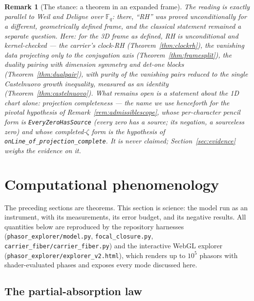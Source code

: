 \documentclass[11pt]{article}
\newtheorem{remark}[definition]{Remark}
\newcommand{\code}[1]{\texttt{#1}}
\begin{document}
\begin{remark}[The stance: a theorem in an expanded frame]\label{rem:framesplit}
The reading is exactly parallel to Weil and Deligne over $\mathbb{F}_q$: there, ``RH'' was proved
unconditionally for a different, geometrically defined frame, and the classical statement remained
a separate question.  Here: for the 3D frame \emph{as defined}, RH is unconditional and
kernel-checked --- the carrier's clock-RH (Theorem~\ref{thm:clockrh}), the vanishing data
projecting only to the conjugation axis (Theorem~\ref{thm:framesplit}), the duality pairing with dimension
symmetry and det-one blocks (Theorem~\ref{thm:dualpair}), with purity of the vanishing pairs
reduced to the single Castelnuovo growth inequality, measured as an identity
(Theorem~\ref{thm:castelnuovo}).  What remains open is a statement about the 1D chart alone:
\emph{projection completeness} --- the name we use henceforth for the pivotal hypothesis of
Remark~\ref{rem:admissiblescope}, whose per-character pencil form is \code{EveryZeroHasSource}
(every zero has a source; its negation, a \emph{sourceless} zero) and whose completed-$\zeta$ form
is the hypothesis of \code{onLine\_of\_projection\_complete}.  It is never claimed; Section~\ref{sec:evidence} weighs
the evidence on it.
\end{remark}

\section{Computational phenomenology}\label{sec:phenomenology}

The preceding sections are theorems.  This section is science: the model run as an instrument, with
its measurements, its error budget, and its negative results.  All quantities below are reproduced
by the repository harnesses (\code{phasor\_explorer/model.py}, \code{focal\_closure.py},
\code{carrier\_fiber/carrier\_fiber.py}) and the interactive WebGL explorer
(\code{phasor\_explorer/explorer\_v2.html}), which renders up to $10^5$ phasors with shader-evaluated
phases and exposes every mode discussed here.

\subsection{The partial-absorption law}\label{sub:absorption}
\end{document}
